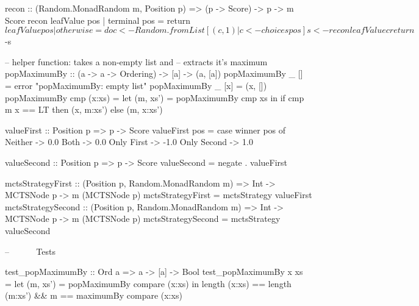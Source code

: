 \begin{code}
recon :: (Random.MonadRandom m, Position p) => (p -> Score) -> p -> m Score
recon leafValue pos
  | terminal pos = return $ leafValue pos
  | otherwise = do
      c <- Random.fromList [(c,1) | c <- choices pos]
      s <- recon leafValue c
      return $ -s

-- helper function: takes a non-empty list and
-- extracts it's maximum
popMaximumBy :: (a -> a -> Ordering) -> [a] -> (a, [a])
popMaximumBy _ [] = error "popMaximumBy: empty list"
popMaximumBy _ [x] = (x, [])
popMaximumBy cmp (x:xs) = 
  let (m, xs') = popMaximumBy cmp xs in
  if cmp m x == LT then (x, m:xs') else (m, x:xs')





valueFirst :: Position p => p -> Score
valueFirst pos =
  case winner pos of
    Neither -> 0.0
    Both -> 0.0
    Only First -> -1.0
    Only Second -> 1.0

valueSecond :: Position p =>  p -> Score
valueSecond = negate . valueFirst


mctsStrategyFirst :: (Position p, Random.MonadRandom m) =>
  Int -> MCTSNode p ->  m (MCTSNode p) 
mctsStrategyFirst = mctsStrategy valueFirst
mctsStrategySecond :: (Position p, Random.MonadRandom m) =>
  Int -> MCTSNode p ->  m (MCTSNode p)
mctsStrategySecond = mctsStrategy valueSecond




-- ~~~~~ Tests ~~~~~~~~~~~~~~~~~~~~~~~~~~~~



test_popMaximumBy :: Ord a => a -> [a] -> Bool
test_popMaximumBy x xs =
  let (m, xs') = popMaximumBy compare (x:xs) in
  length (x:xs) == length (m:xs') && m == maximumBy compare (x:xs)


\end{code}

